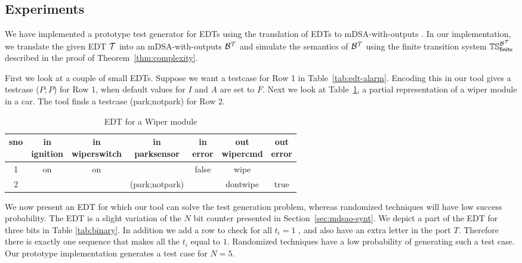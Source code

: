 \subsection{Experiments}
\label{sec:experiments}
We have implemented a prototype test generator for EDTs using the translation of EDTs to mDSA-with-outputs \cite{mDSAcode}. In our implementation, we translate the given EDT $\mathcal{T}$ into an mDSA-with-outputs $\mathcal{B}^{\mathcal{T}}$ and simulate the semantics of $\mathcal{B}^{\mathcal{T}}$ using the finite transition system $\mathbb{TS}_{\mathsf{finite}}^{\mathcal{B}^{\mathcal{T}}}$ described in the proof of Theorem~\ref{thm:complexity}.

First we look at a couple of small EDTs. Suppose we want a testcase for Row 1 in Table~\ref{tab:edt-alarm}. Encoding this in our tool gives a testcase ($P; P$) for Row 1, when default values for $I$ and $A$ are set to $F$.
Next we look at Table~\ref{tab:wiper}, a partial representation of a wiper module in a car. The tool finds a testcase (park;notpark) for Row 2.

\begin{table}[h!]
  \centering {}
  \caption{EDT for a Wiper module}
  \label{tab:wiper}
  \begin{tabular}{|c|c|c|c|c||c|c|}
    \hline
    sno & \specialcell{in \\ ignition} &
                                         \specialcell{in \\ wiperswitch} & 
                                                                       \specialcell{in 
    \\ parksensor} & \specialcell{in \\ error} & \specialcell{out \\ wipercmd} & 
                                             \specialcell{out \\ error} \\
    \hline 
    1 & on & on & 
    & false & wipe &
    \\
    \hline

    2 & & & (park;notpark) & & dontwipe & true \\
    \hline
  \end{tabular}
  
\end{table}


We now present an EDT for which our tool can solve the test generation problem, whereas randomized techniques will have low success probability. 
The EDT is a slight variation of the $N$ bit counter presented in Section~\ref{sec:mdsao-synt}. We depict a part of the EDT for three bits in
Table \ref{tab:binary}. 
In addition we add a row to check for all $t_i = 1$ , and also have an extra letter in the port $T$. Therefore there is exactly one sequence that makes all the $t_i$ equal to $1$. Randomized techniques have a low probability of generating such a test case. 
Our prototype implementation generates a test case for $N=5$. 


